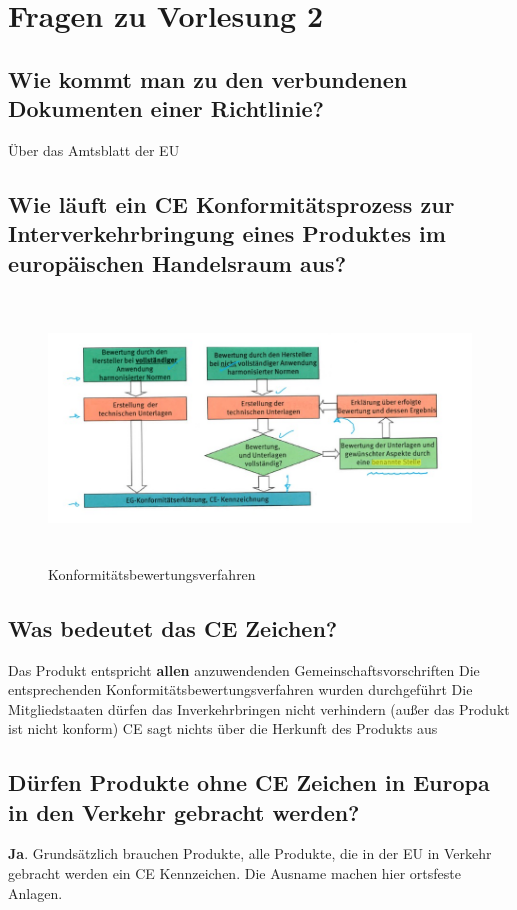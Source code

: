 \section{Fragen zu Vorlesung 2}
\subsection{Wie kommt man zu den verbundenen Dokumenten einer Richtlinie?}
Über das Amtsblatt der EU

\subsection{Wie läuft ein CE Konformitätsprozess zur Interverkehrbringung eines Produktes im europäischen Handelsraum aus?}

\begin{figure}[ht]
  \centering
  \includegraphics[height=7cm]{src/assets/pictures/lv2_konformitaetsprozess.jpg}
  \caption{Konformitätsbewertungsverfahren}
\end{figure}

\subsection{Was bedeutet das CE Zeichen?}
\begin{outline}
  \1 Das Produkt entspricht \textbf{allen} anzuwendenden Gemeinschaftsvorschriften
  \1 Die entsprechenden Konformitätsbewertungsverfahren wurden durchgeführt
  \1 Die Mitgliedstaaten dürfen das Inverkehrbringen nicht verhindern (außer das Produkt ist nicht konform)
  \1 CE sagt nichts über die Herkunft des Produkts aus
\end{outline}

\subsection{Dürfen Produkte ohne CE Zeichen in Europa in den Verkehr gebracht werden?}
\textbf{Ja}. Grundsätzlich brauchen Produkte, alle Produkte, die in der EU in Verkehr gebracht werden ein CE Kennzeichen.\p
Die Ausname machen hier ortsfeste Anlagen.

